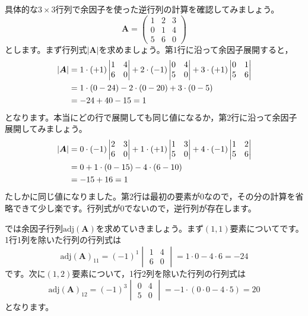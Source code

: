 \documentclass[dvipsnames]{ltjsarticle}
\begin{document}
具体的な$3 \times 3$行列で余因子を使った逆行列の計算を確認してみましょう。
\[
\bm{A} = \begin{pmatrix}
1 & 2 & 3 \\
0 & 1 & 4 \\
5 & 6 & 0
\end{pmatrix}
\]
とします。まず行列式$|\bm{A}|$を求めましょう。第1行に沿って余因子展開すると，
\begin{align}
|\bm{A}| &= 1 \cdot (+1) \begin{vmatrix} 1 & 4 \\ 6 & 0 \end{vmatrix}
+ 2 \cdot (-1) \begin{vmatrix} 0 & 4 \\ 5 & 0 \end{vmatrix}
+ 3 \cdot (+1) \begin{vmatrix} 0 & 1 \\ 5 & 6 \end{vmatrix} \notag \\
&= 1 \cdot (0 - 24) - 2 \cdot (0 - 20) + 3 \cdot (0 - 5) \notag \\
&= -24 + 40 - 15 = 1
\end{align}
となります。本当にどの行で展開しても同じ値になるか，第2行に沿って余因子展開してみましょう。
\begin{align}
|\bm{A}| &= 0 \cdot (-1) \begin{vmatrix} 2 & 3 \\ 6 & 0 \end{vmatrix}
+ 1 \cdot (+1) \begin{vmatrix} 1 & 3 \\ 5 & 0 \end{vmatrix}
+ 4 \cdot (-1) \begin{vmatrix} 1 & 2 \\ 5 & 6 \end{vmatrix} \notag \\
&= 0 + 1 \cdot (0 - 15) - 4 \cdot (6 - 10) \notag \\
&= -15 + 16 = 1
\end{align}
たしかに同じ値になりました。第2行は最初の要素が$0$なので，その分の計算を省略できて少し楽です。行列式が$0$でないので，逆行列が存在します。

では余因子行列$\text{adj}(\bm{A})$を求めていきましょう。まず$(1,1)$要素についてです。1行1列を除いた行列の行列式は
\[
\text{adj}(\bm{A})_{11} = (-1)^1 \begin{vmatrix} 1 & 4 \\ 6 & 0 \end{vmatrix} = 1 \cdot 0 - 4 \cdot 6 = -24
\]
です。次に$(1,2)$要素について，1行2列を除いた行列の行列式は
\[
\text{adj}(\bm{A})_{12} = (-1)^3 \begin{vmatrix} 0 & 4 \\ 5 & 0 \end{vmatrix} = -1 \cdot (0 \cdot 0 - 4 \cdot 5) = 20
\]
となります。
\end{document}
